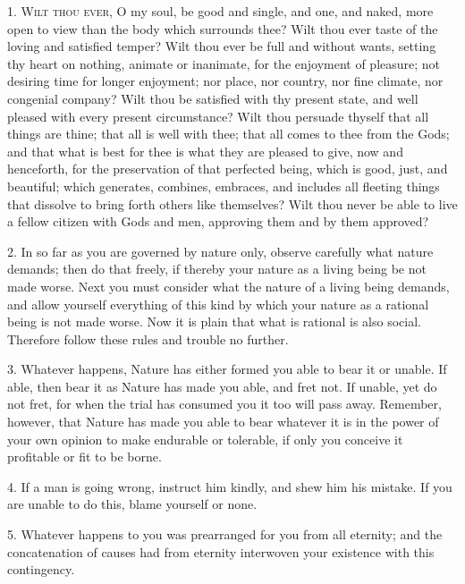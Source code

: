 \documentclass{book}
\begin{document}
1. \textsc{Wilt thou ever,} O my soul, be good and single, and one, and naked,
more open to view than the body which surrounds thee? Wilt thou ever
taste of the loving and satisfied temper? Wilt thou ever be full and
without wants, setting thy heart on nothing, animate or inanimate, for
the enjoyment of pleasure; not desiring time for longer enjoyment; nor
place, nor country, nor fine climate, nor congenial company? Wilt thou
be satisfied with thy present state, and well pleased with every
present circumstance? Wilt thou persuade thyself that all things are
thine; that all is well with thee; that all comes to thee from the
Gods; and that what is best for thee is what they are pleased to give,
now and henceforth, for the preservation of that perfected being,
which is good, just, and beautiful; which generates, combines,
embraces, and includes all fleeting things that dissolve to bring
forth others like themselves? Wilt thou never be able to live a fellow
citizen with Gods and men, approving them and by them approved?

2. In so far as you are governed by nature only, observe carefully
what nature demands; then do that freely, if thereby your nature as a
living being be not made worse. Next you must consider what the nature
of a living being demands, and allow yourself everything of this kind
by which your nature as a rational being is not made worse. Now it is
plain that what is rational is also social. Therefore follow these
rules and trouble no further.

3. Whatever happens, Nature has either formed you able to bear it or
unable. If able, then bear it as Nature has made you able, and fret
not. If unable, yet do not fret, for when the trial has consumed you
it too will pass away. Remember, however, that Nature has made you
able to bear whatever it is in the power of your own opinion to make
endurable or tolerable, if only you conceive it profitable or fit to
be borne.

4. If a man is going wrong, instruct him kindly, and shew him his
mistake. If you are unable to do this, blame yourself or none.

5. Whatever happens to you was prearranged for you from all eternity;
and the concatenation of causes had from eternity interwoven your
existence with this contingency.
\end{document}
